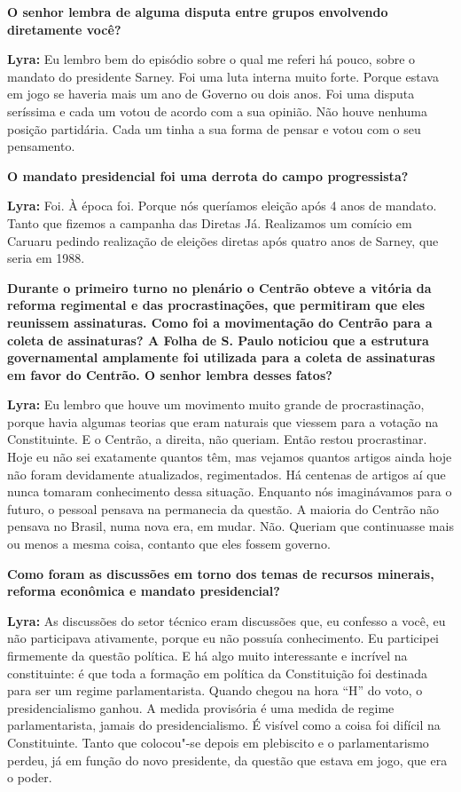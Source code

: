 \textbf{O senhor lembra de alguma disputa entre grupos envolvendo
diretamente você?}

\textbf{Lyra:} Eu lembro bem do episódio sobre o qual me referi há
pouco, sobre o mandato do presidente Sarney. Foi uma luta interna muito
forte. Porque estava em jogo se haveria mais um ano de Governo ou dois
anos. Foi uma disputa seríssima e cada um votou de acordo com a sua
opinião. Não houve nenhuma posição partidária. Cada um tinha a sua forma
de pensar e votou com o seu pensamento.

\textbf{O mandato presidencial foi uma derrota do campo progressista?}

\textbf{Lyra:} Foi. À época foi. Porque nós queríamos eleição após 4
anos de mandato. Tanto que fizemos a campanha das Diretas Já. Realizamos
um comício em Caruaru pedindo realização de eleições diretas após quatro
anos de Sarney, que seria em 1988.

\textbf{Durante o primeiro turno no plenário o Centrão obteve a vitória
da reforma regimental e das procrastinações, que permitiram que eles
reunissem assinaturas. Como foi a movimentação do Centrão para a coleta
de assinaturas? A Folha de S. Paulo noticiou que a estrutura
governamental amplamente foi utilizada para a coleta de assinaturas em
favor do Centrão. O senhor lembra desses fatos?}

\textbf{Lyra:} Eu lembro que houve um movimento muito grande de
procrastinação, porque havia algumas teorias que eram naturais que
viessem para a votação na Constituinte. E o Centrão, a direita, não
queriam. Então restou procrastinar. Hoje eu não sei exatamente quantos
têm, mas vejamos quantos artigos ainda hoje não foram devidamente
atualizados, regimentados. Há centenas de artigos aí que nunca tomaram
conhecimento dessa situação. Enquanto nós imaginávamos para o futuro, o
pessoal pensava na permanecia da questão. A maioria do Centrão não
pensava no Brasil, numa nova era, em mudar. Não. Queriam que continuasse
mais ou menos a mesma coisa, contanto que eles fossem governo.

\textbf{Como foram as discussões em torno dos temas de recursos
minerais, reforma econômica e mandato presidencial?}

\textbf{Lyra:} As discussões do setor técnico eram discussões que, eu
confesso a você, eu não participava ativamente, porque eu não possuía
conhecimento. Eu participei firmemente da questão política. E há algo
muito interessante e incrível na constituinte: é que toda a formação em
política da Constituição foi destinada para ser um regime
parlamentarista. Quando chegou na hora ``H'' do voto, o presidencialismo
ganhou. A medida provisória é uma medida de regime parlamentarista,
jamais do presidencialismo. É visível como a coisa foi difícil na
Constituinte. Tanto que colocou"-se depois em plebiscito e o
parlamentarismo perdeu, já em função do novo presidente, da questão que
estava em jogo, que era o poder.


